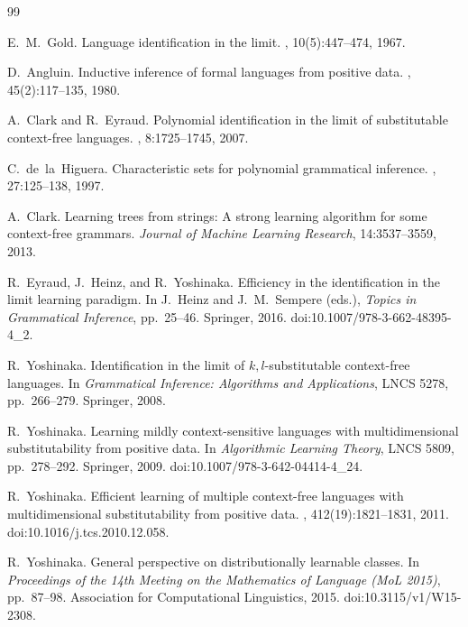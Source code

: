\documentclass[11pt,a4paper]{ltjsarticle}
\numberwithin{equation}{section}
\theoremstyle{plain}
\theoremstyle{definition}
\theoremstyle{remark}
\theoremstyle{plain}
\begin{document}
\begin{thebibliography}{99}

E.~M.~Gold.
\newblock Language identification in the limit.
, 10(5):447--474, 1967.

D.~Angluin.
\newblock Inductive inference of formal languages from positive data.
, 45(2):117--135, 1980.

A.~Clark and R.~Eyraud.
\newblock Polynomial identification in the limit of substitutable context-free
languages.
, 8:1725--1745, 2007.

C.~de~la~Higuera.
\newblock Characteristic sets for polynomial grammatical inference.
, 27:125--138, 1997.

A.~Clark.
\newblock Learning trees from strings: A strong learning algorithm for some context-free grammars.
\newblock \emph{Journal of Machine Learning Research}, 14:3537--3559, 2013.

R.~Eyraud, J.~Heinz, and R.~Yoshinaka.
\newblock Efficiency in the identification in the limit learning paradigm.
\newblock In J.~Heinz and J.~M.~Sempere (eds.), {\em Topics in Grammatical
Inference}, pp.~25--46. Springer, 2016.
\newblock doi:10.1007/978-3-662-48395-4\_2.

R.~Yoshinaka.
\newblock Identification in the limit of $k,l$-substitutable context-free
languages.
\newblock In {\em Grammatical Inference: Algorithms and Applications},
LNCS 5278, pp.~266--279. Springer, 2008.

R.~Yoshinaka.
\newblock Learning mildly context-sensitive languages with multidimensional
 substitutability from positive data.
\newblock In {\em Algorithmic Learning Theory}, LNCS 5809, pp.~278--292.
 Springer, 2009.
\newblock doi:10.1007/978-3-642-04414-4\_24.

R.~Yoshinaka.
\newblock Efficient learning of multiple context-free languages with
multidimensional substitutability from positive data.
, 412(19):1821--1831, 2011.
\newblock doi:10.1016/j.tcs.2010.12.058.

R.~Yoshinaka.
\newblock General perspective on distributionally learnable classes.
\newblock In \emph{Proceedings of the 14th Meeting on the Mathematics
of Language (MoL 2015)}, pp.~87--98.
Association for Computational Linguistics, 2015.
\newblock doi:10.3115/v1/W15-2308.


\end{thebibliography}
\end{document}
